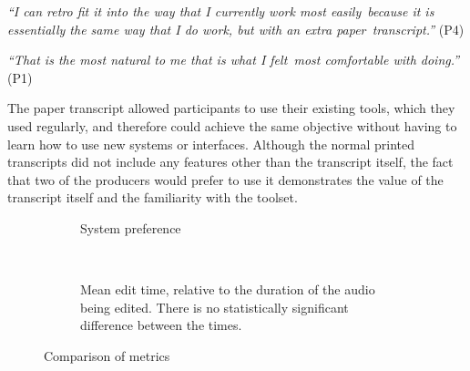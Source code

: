 \textit{``I can retro fit it into the way that I currently work most easily because it is essentially the same way that
I do work, but with an extra paper transcript.''} (P4)

\textit{``That is the most natural to me that is what I felt most comfortable with doing.''} (P1)

The paper transcript allowed participants to use their existing tools, which they used regularly, and therefore could
achieve the same objective without having to learn how to use new systems or interfaces. Although the normal printed
transcripts did not include any features other than the transcript itself, the fact that two of the producers would
prefer to use it demonstrates the value of the transcript itself and the familiarity with the toolset.

\begin{figure}[p]
  \begin{subfigure}[b]{0.5\textwidth}
    \centering
    \label{fig:preference}
    \caption{System preference}
  \end{subfigure}
  ~
  \begin{subfigure}[b]{0.5\textwidth}
    \centering
    \label{fig:paperspeed}
    \caption{Mean edit time, relative to the duration of the audio being edited. There is no statistically significant
    difference between the times.}
  \end{subfigure}
  \caption{Comparison of metrics}
\end{figure}

